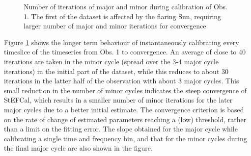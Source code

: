 \documentclass{aa}
\begin{document}
\begin{figure}[tbh]

\caption{\label{fig:Major-and-minor}Number of iterations of major and minor
 during calibration of Obs. 1. The first
 of the dataset is affected by the flaring Sun, requiring
 larger number of major and minor iterations for convergence}
\end{figure}


Figure   \ref{fig:Major-and-minor}   shows   the   longer  term   behaviour   of
instantaneously calibrating  every timeslice  of the timeseries  from Obs.  1 to
convergence. An average  of close to 40 iterations are taken  in the minor cycle
(spread over the 3-4 major cycle iterations) in the initial part of the dataset,
while this reduces to about 30  iterations in the latter half of the observation
with about  3 major cycles. This small  reduction in the number  of minor cycles
indicates the steep convergence of StEFCal, which results in a smaller number of
minor  iterations  for   the  later  major  cycles  due   to  a  better  initial
estimate. The convergence criterion is based  on the rate of change of estimated
parameters  reaching a  (low)  threshold, rather  than  a limit  on the  fitting
error. The  slope obtained for the  major cycle while calibrating  a single time
and frequency  bin, and that for the  minor cycles during the  final major cycle
are also shown in the figure.
\end{document}

